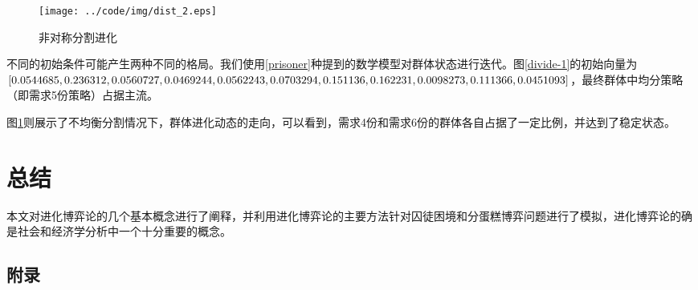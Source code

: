 \documentclass[twocolumn]{article}
\begin{document}
    \begin{figure}\centering
        \texttt{[image: ../code/img/dist\_2.eps]}
        \caption{非对称分割进化}
        \label{divide-2}
    \end{figure}

    不同的初始条件可能产生两种不同的格局。我们使用\ref{prisoner}种提到的数学模型对群体状态进行迭代。图\ref{divide-1}的初始向量为$[0.0544685, 0.236312, 0.0560727, \\0.0469244, 0.0562243, 0.0703294, 0.151136, 0.162231, \\0.0098273, 0.111366, 0.0451093]$，最终群体中均分策略（即需求5份策略）占据主流。

    图\ref{divide-2}则展示了不均衡分割情况下，群体进化动态的走向，可以看到，需求4份和需求6份的群体各自占据了一定比例，并达到了稳定状态。

    \section{总结}
    本文对进化博弈论的几个基本概念进行了阐释，并利用进化博弈论的主要方法针对囚徒困境和分蛋糕博弈问题进行了模拟，进化博弈论的确是社会和经济学分析中一个十分重要的概念。

    \pagebreak

    \begin{strip}
        \section{附录}
        
    \end{strip}

    
\end{document}
